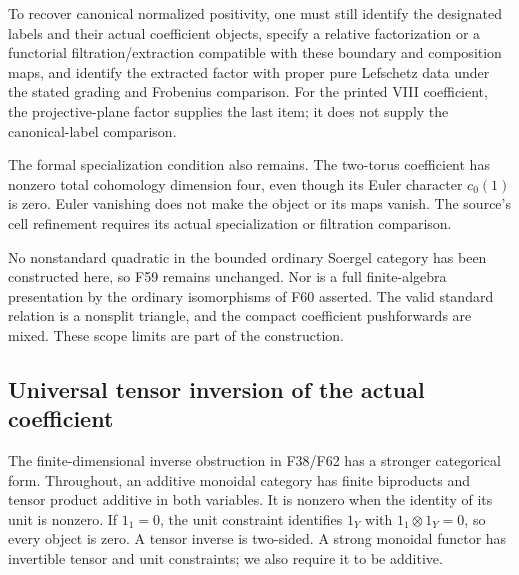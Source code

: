 \documentclass[11pt,a4paper]{article}
\newcommand{\fid}[1]{\textsf{#1}}\newcommand{\gate}[1]{\textsf{#1}}
\theoremstyle{named}\newtheorem{finding}{Finding}[section]
\theoremstyle{definition}\newtheorem{definition}[finding]{Definition}
\theoremstyle{remark}\newtheorem{remark}[finding]{Remark}
\begin{document}
To recover canonical normalized positivity, one must still
identify the designated labels and their actual coefficient
objects, specify a relative factorization or a functorial
filtration/extraction compatible with these boundary and
composition maps, and identify the extracted factor with
proper pure Lefschetz data under the stated grading and
Frobenius comparison.
For the printed VIII coefficient, the projective-plane
factor supplies the last item; it does not supply the
canonical-label comparison.

The formal specialization condition also remains.
The two-torus coefficient has nonzero total cohomology
dimension four, even though its Euler character
\(c_0(1)\) is zero. Euler vanishing does not make the
object or its maps vanish. The source's cell refinement
requires its actual specialization or filtration comparison.

No nonstandard quadratic in the bounded ordinary Soergel
category has been constructed here, so \fid{F59} remains
unchanged. Nor is a full finite-algebra presentation by the
ordinary isomorphisms of \fid{F60} asserted. The valid
standard relation is a nonsplit triangle, and the compact
coefficient pushforwards are mixed. These scope limits are
part of the construction.

\subsection{Universal tensor inversion of the actual coefficient}

The finite-dimensional inverse obstruction in
\fid{F38}/\fid{F62} has a stronger categorical form.
Throughout, an additive monoidal category has finite
biproducts and tensor product additive in both variables.
It is nonzero when the identity of its unit is nonzero.
If \(1_1=0\), the unit constraint identifies
\(1_Y\) with \(1_1\otimes1_Y=0\), so every object is zero.
A tensor inverse is two-sided. A strong monoidal
functor has invertible tensor and unit constraints;
we also require it to be additive.
\end{document}
